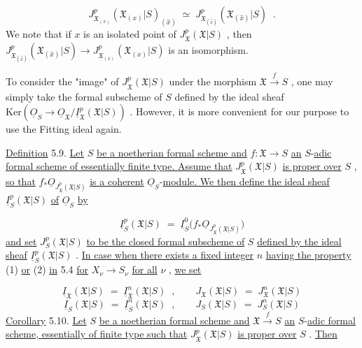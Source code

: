 \begin{equation*}
J^{p}_{\mathfrak{X}_{(x)}}(\mathfrak{X}_{(x)}|S)_{(\hat{x})} \;\simeq\; J^{p}_{\mathfrak{X}_{(\hat{x})}}(\mathfrak{X}_{(\hat{x})}|S) \;\;.
\end{equation*}
We note that if $x$ is an isolated point of $J^{p}_{\mathfrak{X}}(\mathfrak{X}|S)$ , then $J^{p}_{\mathfrak{X}_{(\hat{x})}}(\mathfrak{X}_{(\hat{x})}|S) \to J^{p}_{\mathfrak{X}_{(x)}}(\mathfrak{X}_{(x)}|S)$ is an isomorphism.

To consider the "image" of $J^{p}_{\mathfrak{X}}(\mathfrak{X}|S)$ under the morphism $\mathfrak{X} \xrightarrow{\,f\,} S$ , one may simply take the formal subscheme of $S$ defined by the ideal sheaf $\mathrm{Ker}(\underline{O}_S \to \underline{O}_{\mathfrak{X}}/\underline{I}^{p}_{\mathfrak{X}}(\mathfrak{X}|S))$ . However, it is more convenient for our purpose to use the Fitting ideal again.

\underline{Definition} 5.9. \underline{Let} $S$ \underline{be a noetherian formal scheme and} $f : \mathfrak{X} \to S$ \underline{an} $S$-\underline{adic formal scheme of essentially finite type. Assume that} $J^{p}_{\mathfrak{X}}(\mathfrak{X}|S)$ \underline{is proper over} $S$ , \underline{so that} $f_{*}\underline{O}_{J^{p}_{\mathfrak{X}}(\mathfrak{X}|S)}$ \underline{is a coherent} $\underline{O}_S$-\underline{module. We then define the ideal sheaf} $\underline{I}^{p}_{S}(\mathfrak{X}|S)$ \underline{of} $\underline{O}_S$ \underline{by}

\begin{equation*}
\underline{I}^{p}_{S}(\mathfrak{X}|S) \;=\; \underline{I}^{0}_{S}\big(f_{*}\underline{O}_{J^{p}_{\mathfrak{X}}(\mathfrak{X}|S)}\big)
\end{equation*}
\underline{and set} $J^{p}_{S}(\mathfrak{X}|S)$ \underline{to be the closed formal subscheme of} $S$ \underline{defined by the ideal sheaf} $\underline{I}^{p}_{S}(\mathfrak{X}|S)$ . \underline{In case when there exists a fixed integer} $n$ \underline{having the property} (1) \underline{or} (2) \underline{in} 5.4 \underline{for} $X_\nu \to S_\nu$ \underline{for all} $\nu$ , \underline{we set}

\begin{equation*}
\underline{I}_{\mathfrak{X}}(\mathfrak{X}|S) \;=\; \underline{I}^{n}_{\mathfrak{X}}(\mathfrak{X}|S) \;\;,\qquad J_{\mathfrak{X}}(\mathfrak{X}|S) \;=\; J^{n}_{\mathfrak{X}}(\mathfrak{X}|S)
\end{equation*}
\begin{equation*}
\underline{I}_{S}(\mathfrak{X}|S) \;=\; \underline{I}^{n}_{S}(\mathfrak{X}|S) \;\;,\qquad J_{S}(\mathfrak{X}|S) \;=\; J^{n}_{S}(\mathfrak{X}|S)
\end{equation*}
\underline{Corollary} 5.10. \underline{Let} $S$ \underline{be a noetherian formal scheme and} $\mathfrak{X} \xrightarrow{\,f\,} S$ \underline{an} $S$-\underline{adic formal scheme, essentially of finite type such that} $J^{p}_{\mathfrak{X}}(\mathfrak{X}|S)$ \underline{is proper over} $S$ . \underline{Then}

